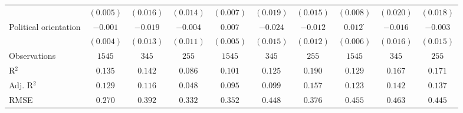 \begin{center}
\begin{small}
\begin{longtable}{l@{} c@{} c@{} c@{} c@{} c@{} c@{} c@{} c@{} c@{}}
                                    & $(0.005)$       & $(0.016)$        & $(0.014)$    & $(0.007)$       & $(0.019)$        & $(0.015)$        & $(0.008)$       & $(0.020)$       & $(0.018)$       \\
\quad Political orientation         & $-0.001$        & $-0.019$         & $-0.004$     & $0.007$         & $-0.024$         & $-0.012$         & $0.012^{\cdot}$ & $-0.016$        & $-0.003$        \\
                                    & $(0.004)$       & $(0.013)$        & $(0.011)$    & $(0.005)$       & $(0.015)$        & $(0.012)$        & $(0.006)$       & $(0.016)$       & $(0.015)$       \\
\hline
Observations                        & $1545$          & $345$            & $255$        & $1545$          & $345$            & $255$            & $1545$          & $345$           & $255$           \\
R$^2$                               & $0.135$         & $0.142$          & $0.086$      & $0.101$         & $0.125$          & $0.190$          & $0.129$         & $0.167$         & $0.171$         \\
Adj. R$^2$                          & $0.129$         & $0.116$          & $0.048$      & $0.095$         & $0.099$          & $0.157$          & $0.123$         & $0.142$         & $0.137$         \\
RMSE                                & $0.270$         & $0.392$          & $0.332$      & $0.352$         & $0.448$          & $0.376$          & $0.455$         & $0.463$         & $0.445$         \\
\end{longtable}
\end{small}
\end{center}
